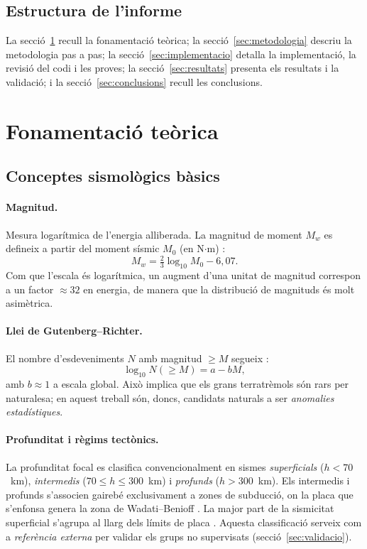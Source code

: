 \documentclass[11pt,a4paper]{article}
\begin{document}
\subsection{Estructura de l'informe}
La secció~\ref{sec:teoria} recull la fonamentació teòrica; la
secció~\ref{sec:metodologia} descriu la metodologia pas a pas;
la secció~\ref{sec:implementacio} detalla la implementació, la revisió del codi
i les proves; la secció~\ref{sec:resultats} presenta els resultats i la
validació; i la secció~\ref{sec:conclusions} recull les conclusions.

\section{Fonamentació teòrica}\label{sec:teoria}

\subsection{Conceptes sismològics bàsics}
\paragraph{Magnitud.} Mesura logarítmica de l'energia alliberada. La magnitud
de moment $M_w$ es defineix a partir del moment sísmic $M_0$ (en N$\cdot$m)
\cite{hanks1979}:
\begin{equation}
  M_w = \tfrac{2}{3}\log_{10} M_0 - 6{,}07 .
\end{equation}
Com que l'escala és logarítmica, un augment d'una unitat de magnitud correspon
a un factor $\approx 32$ en energia, de manera que la distribució de
magnituds és molt asimètrica.

\paragraph{Llei de Gutenberg--Richter.} El nombre d'esdeveniments $N$ amb
magnitud $\ge M$ segueix \cite{gutenberg1944}:
\begin{equation}
  \log_{10} N(\ge M) = a - bM,
\end{equation}
amb $b\approx 1$ a escala global. Això implica que els grans terratrèmols són
rars per naturalesa; en aquest treball són, doncs, candidats naturals a ser
\emph{anomalies estadístiques}.

\paragraph{Profunditat i règims tectònics.} La profunditat focal es clasifica
convencionalment en sismes \emph{superficials} ($h<70$~km), \emph{intermedis}
($70\le h\le 300$~km) i \emph{profunds} ($h>300$~km). Els intermedis i profunds
s'associen gairebé exclusivament a zones de subducció, on la placa que
s'enfonsa genera la zona de Wadati--Benioff \cite{benioff1949}. La major part
de la sismicitat superficial s'agrupa al llarg dels límits de placa
\cite{bird2003}. Aquesta classificació serveix com a \emph{referència externa}
per validar els grups no supervisats (secció~\ref{sec:validacio}).
\end{document}
